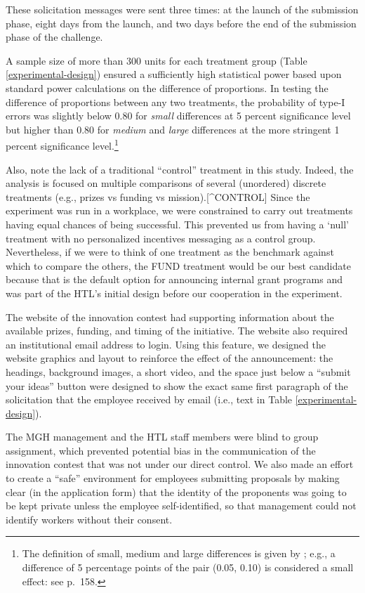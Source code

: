 \documentclass[11pt]{article}
\begin{document}


These solicitation messages were sent three times: at the launch of the
submission phase, eight days from the launch, and two days before the
end of the submission phase of the challenge.

A sample size of more than 300 units for each treatment group (Table
\ref{experimental-design}) ensured a sufficiently high statistical power
based upon standard power calculations on the difference of proportions.
In testing the difference of proportions between any two treatments, the
probability of type-I errors was slightly below \(0.80\) for
\emph{small} differences at 5 percent significance level but higher than
\(0.80\) for \emph{medium} and \emph{large} differences at the more
stringent 1 percent significance level.\footnote{The definition of
  small, medium and large differences is given by
  \citet{cohen1992power}; e.g., a difference of 5 percentage points of
  the pair (0.05, 0.10) is considered a small effect: see
  \citet{cohen1992power} p.~158.}

Also, note the lack of a traditional ``control'' treatment in this
study. Indeed, the analysis is focused on multiple comparisons of
several (unordered) discrete treatments (e.g., prizes vs funding vs
mission).{[}\^{}CONTROL{]} Since the experiment was run in a workplace,
we were constrained to carry out treatments having equal chances of
being successful. This prevented us from having a `null' treatment with
no personalized incentives messaging as a control group. Nevertheless,
if we were to think of one treatment as the benchmark against which to
compare the others, the FUND treatment would be our best candidate
because that is the default option for announcing internal grant
programs and was part of the HTL's initial design before our cooperation
in the experiment.

The website of the innovation contest had supporting information about
the available prizes, funding, and timing of the initiative. The website
also required an institutional email address to login. Using this
feature, we designed the website graphics and layout to reinforce the
effect of the announcement: the headings, background images, a short
video, and the space just below a ``submit your ideas'' button were
designed to show the exact same first paragraph of the solicitation that
the employee received by email (i.e., text in Table
\ref{experimental-design}).

The MGH management and the HTL staff members were blind to group
assignment, which prevented potential bias in the communication of the
innovation contest that was not under our direct control. We also made
an effort to create a ``safe'' environment for employees submitting
proposals by making clear (in the application form) that the identity of
the proponents was going to be kept private unless the employee
self-identified, so that management could not identify workers without
their consent.
\end{document}
